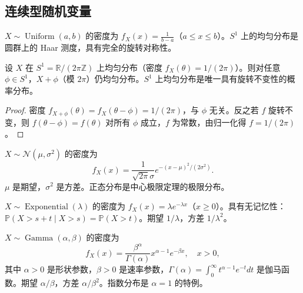\subsection{连续型随机变量}

\begin{definition}[均匀分布]\label{def:uniform_distribution}
$X \sim \operatorname{Uniform}(a, b)$ 的密度为 $f_X(x) = \frac{1}{b-a}$（$a \le x \le b$）。$S^1$ 上的均匀分布是圆群上的 Haar 测度，具有完全的旋转对称性。
\end{definition}

\begin{proposition}[$S^1$ 上均匀分布的旋转不变性]\label{prop:S1_uniform_rotation}
设 $X$ 在 $S^1 = \mathbb{R}/(2\pi\mathbb{Z})$ 上均匀分布（密度 $f_X(\theta) = 1/(2\pi)$）。则对任意 $\phi \in S^1$，$X + \phi$（模 $2\pi$）仍均匀分布。$S^1$ 上均匀分布是唯一具有旋转不变性的概率分布。
\end{proposition}

\begin{proof}
密度 $f_{X+\phi}(\theta) = f_X(\theta - \phi) = 1/(2\pi)$，与 $\phi$ 无关。反之若 $f$ 旋转不变，则 $f(\theta - \phi) = f(\theta)$ 对所有 $\phi$ 成立，$f$ 为常数，由归一化得 $f = 1/(2\pi)$。
\end{proof}

\begin{definition}[正态分布]\label{def:normal_distribution}
$X \sim \mathcal{N}(\mu, \sigma^2)$ 的密度为
\[
f_X(x) = \frac{1}{\sqrt{2\pi}\sigma} e^{-(x-\mu)^2/(2\sigma^2)}.
\]
$\mu$ 是期望，$\sigma^2$ 是方差。正态分布是中心极限定理的极限分布。
\end{definition}

\begin{definition}[指数分布]\label{def:exponential_distribution}
$X \sim \operatorname{Exponential}(\lambda)$ 的密度为 $f_X(x) = \lambda e^{-\lambda x}$（$x \ge 0$）。具有无记忆性：$\mathbb{P}(X > s + t \mid X > s) = \mathbb{P}(X > t)$。期望 $1/\lambda$，方差 $1/\lambda^2$。
\end{definition}

\begin{definition}[伽马分布]\label{def:gamma_distribution}
$X \sim \operatorname{Gamma}(\alpha, \beta)$ 的密度为
\[
f_X(x) = \frac{\beta^\alpha}{\Gamma(\alpha)} x^{\alpha-1} e^{-\beta x}, \quad x > 0,
\]
其中 $\alpha > 0$ 是形状参数，$\beta > 0$ 是速率参数，$\Gamma(\alpha) = \int_0^\infty t^{\alpha-1} e^{-t} dt$ 是伽马函数。期望 $\alpha/\beta$，方差 $\alpha/\beta^2$。指数分布是 $\alpha = 1$ 的特例。
\end{definition}


